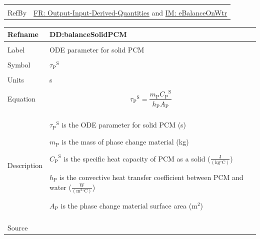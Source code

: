 \documentclass[12pt]{article}
\begin{document}
\begin{minipage}{\textwidth}
\begin{tabular}{>{\raggedright}p{}>{\raggedright\arraybackslash}p{}}
\\ \midrule \\
RefBy & \hyperref[outputInputDerivQuants]{FR: Output-Input-Derived-Quantities} and \hyperref[IM:eBalanceOnWtr]{IM: eBalanceOnWtr}
        
\\ \bottomrule
\end{tabular}
\end{minipage}

\vspace{\baselineskip}
\noindent
\begin{minipage}{\textwidth}
\begin{tabular}{>{\raggedright}p{}>{\raggedright\arraybackslash}p{}}
\toprule \textbf{Refname} & \textbf{DD:balanceSolidPCM}
\label{DD:balanceSolidPCM}
\\ \midrule \\
Label & ODE parameter for solid PCM
        
\\ \midrule \\
Symbol & ${{τ_{\text{P}}}^{\text{S}}}$
         
\\ \midrule \\
Units & s
        
\\ \midrule \\
Equation & \begin{displaymath}
           {{τ_{\text{P}}}^{\text{S}}}=\frac{{m_{\text{P}}} {{C_{\text{P}}}^{\text{S}}}}{{h_{\text{P}}} {A_{\text{P}}}}
           \end{displaymath}
\\ \midrule \\
Description & \begin{symbDescription}
              \item{${{τ_{\text{P}}}^{\text{S}}}$ is the ODE parameter for solid PCM (s)}
              \item{${m_{\text{P}}}$ is the mass of phase change material (kg)}
              \item{${{C_{\text{P}}}^{\text{S}}}$ is the specific heat capacity of PCM as a solid ($\frac{\text{J}}{(\text{kg}{}^{\circ}\text{C})}$)}
              \item{${h_{\text{P}}}$ is the convective heat transfer coefficient between PCM and water ($\frac{\text{W}}{(\text{m}^{2}{}^{\circ}\text{C})}$)}
              \item{${A_{\text{P}}}$ is the phase change material surface area ($\text{m}^{2}$)}
              \end{symbDescription}
\\ \midrule \\
Source & \cite{lightstone2012}
         

\end{tabular}
\end{minipage}
\end{document}
